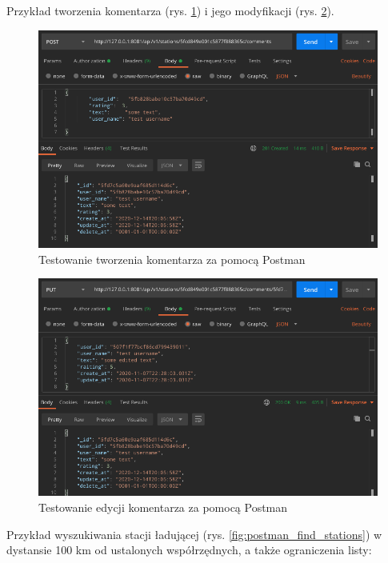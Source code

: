 Przykład tworzenia komentarza (rys. \ref{fig:postman_create_comment}) i jego modyfikacji (rys. \ref{fig:postman_edit_comment}).
\begin{figure}[ht]
    \centering
        \includegraphics[width=0.9\linewidth]{rys04/postman_comment_create.png}
        \caption{Testowanie tworzenia komentarza za pomocą Postman}
    \label{fig:postman_create_comment}
\end{figure}
\begin{figure}[ht]
    \centering
        \includegraphics[width=0.9\linewidth]{rys04/postman_comment_edit.png}
        \caption{Testowanie edycji komentarza za pomocą Postman}
    \label{fig:postman_edit_comment}
\end{figure}
\newpage
Przykład wyszukiwania stacji ładującej (rys. \ref{fig:postman_find_stations}) w dystansie 100 km od ustalonych współrzędnych, a także ograniczenia listy:
